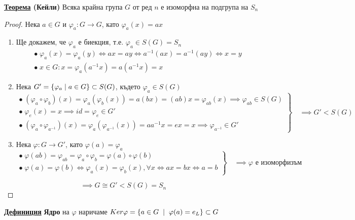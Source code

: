 \documentclass{article}
\begin{document}
\textbf{\underline{Теорема} (Кейли)} \newline
Всяка крайна група $G$ от ред $n$ е изоморфна на подгрупа на $S_n$
\begin{proof}
Нека $a \in G$ и $\varphi_a : G \rightarrow G$, като $\varphi_a(x) = ax$
\begin{enumerate}
    \item Ще докажем, че $\varphi_a$ е биекция, т.е. $\varphi_a \in S(G) = S_n$
    \[
    \begin{array}{ll}
        \bullet \; \varphi_a(x) = \varphi_a(y) \iff ax = ay \iff a^{-1}(ax) = a^{-1}(ay) \iff x = y \\
        \bullet \; x \in G : x = \varphi_a(a^{-1}x) = a(a^{-1}x) = x
    \end{array}
    \]
    \item Нека $G' = \{\varphi_a \hspace{0.1cm} | \hspace{0.1cm} a \in G\} \subset S(G)$, където $\varphi_a \in S(G)$
    \[
    \left.
    \begin{array}{ll}
        \bullet \; (\varphi_a \circ \varphi_b)(x) = \varphi_a(\varphi_b(x)) = a(bx) = (ab)x = \varphi_{ab}(x) \implies \varphi_{ab} \in S(G) \\
        \bullet \; \varphi_e(x) = x \implies id = \varphi_e \in G' \\
        \bullet \; (\varphi_a \circ \varphi_{a^{-1}})(x) = \varphi_a(\varphi_{a^{-1}}(x)) = aa^{-1}x = ex = x \implies \varphi_{a^{-1}} \in G'
    \end{array} \right\} \quad \implies G' < S(G)
    \]
    \item Нека $\varphi : G \rightarrow G'$, като $\varphi(a) = \varphi_a$
    \[
    \left.
    \begin{array}{ll}
    \bullet \; \varphi(ab) = \varphi_{ab} = \varphi_a \circ \varphi_b = \varphi(a) \circ \varphi(b) \\
    \bullet \; \varphi(a) = \varphi(b) \iff \varphi_a(x) = \varphi_b(x), \forall x \iff ax = bx \iff a = b
    \end{array} \right\} \quad \implies \varphi \text{ е изоморфизъм}
    \]
\end{enumerate}
$$\implies G \cong G' < S(G) = S_n \hspace{1cm}$$
\end{proof}
\textbf{\underline{Дефиниция}}
\textbf{Ядро} на $\varphi$ наричаме $Ker \varphi = \{a \in G \hspace{0.2cm} | \hspace{0.2cm} \varphi(a) = e_L\} \subset G$ \newline\newline
\end{document}
